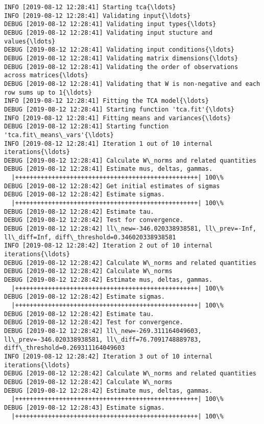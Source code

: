 \documentclass[11pt]{article}
\begin{document}
    \begin{Verbatim}[commandchars=\\\{\}]
INFO [2019-08-12 12:28:41] Starting tca{\ldots}
INFO [2019-08-12 12:28:41] Validating input{\ldots}
DEBUG [2019-08-12 12:28:41] Validating input types{\ldots}
DEBUG [2019-08-12 12:28:41] Validating input stucture and values{\ldots}
DEBUG [2019-08-12 12:28:41] Validating input conditions{\ldots}
DEBUG [2019-08-12 12:28:41] Validating matrix dimensions{\ldots}
DEBUG [2019-08-12 12:28:41] Validating the order of observations across matrices{\ldots}
DEBUG [2019-08-12 12:28:41] Validating that W is non-negative and each row sums up to 1{\ldots}
INFO [2019-08-12 12:28:41] Fitting the TCA model{\ldots}
DEBUG [2019-08-12 12:28:41] Starting function 'tca.fit'{\ldots}
INFO [2019-08-12 12:28:41] Fitting means and variances{\ldots}
DEBUG [2019-08-12 12:28:41] Starting function 'tca.fit\_means\_vars'{\ldots}
INFO [2019-08-12 12:28:41] Iteration 1 out of 10 internal iterations{\ldots}
DEBUG [2019-08-12 12:28:41] Calculate W\_norms and related quantities
DEBUG [2019-08-12 12:28:41] Estimate mus, deltas, gammas.
  |++++++++++++++++++++++++++++++++++++++++++++++++++| 100\%
DEBUG [2019-08-12 12:28:42] Get initial estimates of sigmas
DEBUG [2019-08-12 12:28:42] Estimate sigmas.
  |++++++++++++++++++++++++++++++++++++++++++++++++++| 100\%
DEBUG [2019-08-12 12:28:42] Estimate tau.
DEBUG [2019-08-12 12:28:42] Test for convergence.
DEBUG [2019-08-12 12:28:42] ll\_new=-346.020338938581, ll\_prev=-Inf, ll\_diff=Inf, diff\_threshold=0.346020338938581
INFO [2019-08-12 12:28:42] Iteration 2 out of 10 internal iterations{\ldots}
DEBUG [2019-08-12 12:28:42] Calculate W\_norms and related quantities
DEBUG [2019-08-12 12:28:42] Calculate W\_norms
DEBUG [2019-08-12 12:28:42] Estimate mus, deltas, gammas.
  |++++++++++++++++++++++++++++++++++++++++++++++++++| 100\%
DEBUG [2019-08-12 12:28:42] Estimate sigmas.
  |++++++++++++++++++++++++++++++++++++++++++++++++++| 100\%
DEBUG [2019-08-12 12:28:42] Estimate tau.
DEBUG [2019-08-12 12:28:42] Test for convergence.
DEBUG [2019-08-12 12:28:42] ll\_new=-269.311164049603, ll\_prev=-346.020338938581, ll\_diff=76.7091748889783, diff\_threshold=0.269311164049603
INFO [2019-08-12 12:28:42] Iteration 3 out of 10 internal iterations{\ldots}
DEBUG [2019-08-12 12:28:42] Calculate W\_norms and related quantities
DEBUG [2019-08-12 12:28:42] Calculate W\_norms
DEBUG [2019-08-12 12:28:42] Estimate mus, deltas, gammas.
  |++++++++++++++++++++++++++++++++++++++++++++++++++| 100\%
DEBUG [2019-08-12 12:28:43] Estimate sigmas.
  |++++++++++++++++++++++++++++++++++++++++++++++++++| 100\%

\end{Verbatim}
\end{document}
